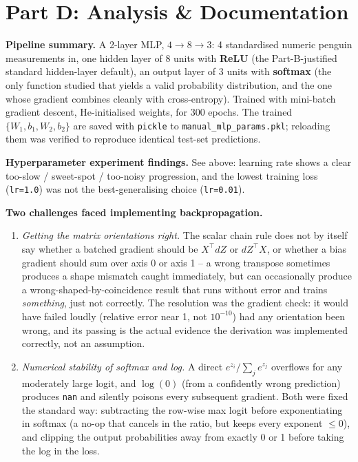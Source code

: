 \documentclass[11pt,a4paper]{article}
\begin{document}
\section*{Part D: Analysis \& Documentation}

\textbf{Pipeline summary.} A 2-layer MLP, $4 \to 8 \to 3$: 4 standardised numeric
penguin measurements in, one hidden layer of 8 units with \textbf{ReLU} (the
Part-B-justified standard hidden-layer default), an output layer of 3 units with
\textbf{softmax} (the only function studied that yields a valid probability
distribution, and the one whose gradient combines cleanly with cross-entropy). Trained
with mini-batch gradient descent, He-initialised weights, for 300 epochs. The trained
$\{W_1, b_1, W_2, b_2\}$ are saved with \texttt{pickle} to
\texttt{manual\_mlp\_params.pkl}; reloading them was verified to reproduce identical
test-set predictions.

\textbf{Hyperparameter experiment findings.} See above: learning rate shows a clear
too-slow / sweet-spot / too-noisy progression, and the lowest training loss
(\texttt{lr=1.0}) was not the best-generalising choice (\texttt{lr=0.01}).

\textbf{Two challenges faced implementing backpropagation.}
\begin{enumerate}
    \item \emph{Getting the matrix orientations right.} The scalar chain rule does not
    by itself say whether a batched gradient should be $X^\top dZ$ or $dZ^\top X$, or
    whether a bias gradient should sum over axis 0 or axis 1 -- a wrong transpose
    sometimes produces a shape mismatch caught immediately, but can occasionally produce
    a wrong-shaped-by-coincidence result that runs without error and trains
    \emph{something}, just not correctly. The resolution was the gradient check: it
    would have failed loudly (relative error near 1, not $10^{-10}$) had any orientation
    been wrong, and its passing is the actual evidence the derivation was implemented
    correctly, not an assumption.
    \item \emph{Numerical stability of softmax and log.} A direct
    $e^{z_i}/\sum_j e^{z_j}$ overflows for any moderately large logit, and $\log(0)$
    (from a confidently wrong prediction) produces \texttt{nan} and silently poisons
    every subsequent gradient. Both were fixed the standard way: subtracting the
    row-wise max logit before exponentiating in softmax (a no-op that cancels in the
    ratio, but keeps every exponent $\le 0$), and clipping the output probabilities away
    from exactly 0 or 1 before taking the log in the loss.
\end{enumerate}
\end{document}

